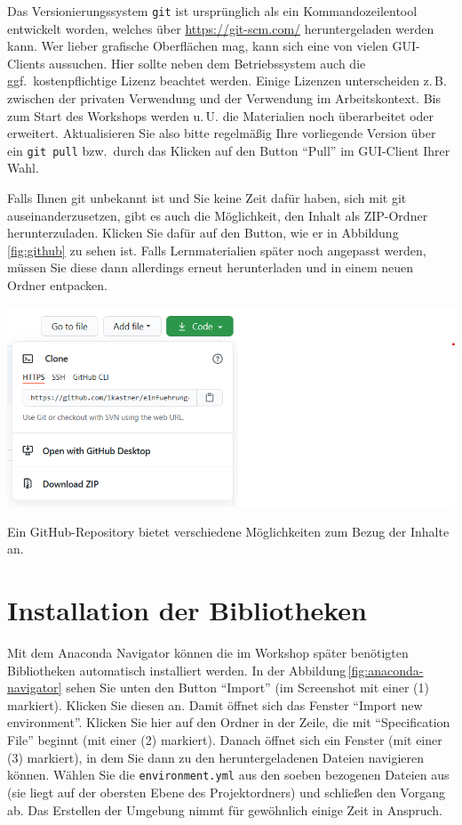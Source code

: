 \documentclass{tufte-handout}
\begin{document}
Das Versionierungssystem \texttt{git} ist ursprünglich als ein Kommandozeilentool entwickelt worden, welches über \url{https://git-scm.com/} heruntergeladen werden kann.
Wer lieber grafische Oberflächen mag, kann sich eine von vielen GUI-Clients%
aussuchen.
Hier sollte neben dem Betriebssystem auch die ggf.\ kostenpflichtige Lizenz beachtet werden.
Einige Lizenzen unterscheiden z.\,B. zwischen der privaten Verwendung und der Verwendung im Arbeitskontext.
Bis zum Start des Workshops werden u.\,U. die Materialien noch überarbeitet oder erweitert.
Aktualisieren Sie also bitte regelmäßig Ihre vorliegende Version über ein \texttt{git pull} bzw.\ durch das Klicken auf den Button \enquote{Pull} im GUI-Client Ihrer Wahl.

Falls Ihnen git unbekannt ist und Sie keine Zeit dafür haben, sich mit git auseinanderzusetzen, gibt es auch die Möglichkeit, den Inhalt als ZIP-Ordner herunterzuladen.
Klicken Sie dafür auf den Button, wie er in Abbildung\,\ref{fig:github} zu sehen ist.
Falls Lernmaterialien später noch angepasst werden, müssen Sie diese dann allerdings erneut herunterladen und in einem neuen Ordner entpacken.

\begin{marginfigure}
  \includegraphics{github-zip}
  \caption{Ein GitHub-Repository bietet verschiedene Möglichkeiten zum Bezug der Inhalte an.}%
\label{fig:github}
\end{marginfigure}


\section{Installation der Bibliotheken}

Mit dem Anaconda Navigator können die im Workshop später benötigten Bibliotheken automatisch installiert werden.
In der Abbildung\,\ref{fig:anaconda-navigator} sehen Sie unten den Button \enquote{Import} (im Screenshot mit einer (1) markiert).
Klicken Sie diesen an.
Damit öffnet sich das Fenster \enquote{Import new environment}.
Klicken Sie hier auf den Ordner in der Zeile, die mit 
\enquote{Specification File}
beginnt (mit einer (2) markiert).
Danach öffnet sich ein Fenster (mit einer (3) markiert), in dem Sie dann zu den heruntergeladenen Dateien navigieren können.
Wählen Sie die \texttt{environment.yml} aus den soeben bezogenen Dateien aus (sie liegt auf der obersten Ebene des Projektordners) und schließen den Vorgang ab.
Das Erstellen der Umgebung nimmt für gewöhnlich einige Zeit in Anspruch.
\end{document}
